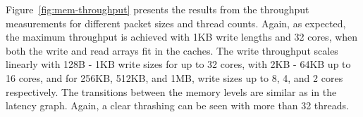 Figure~\ref{fig:mem-throughput} presents the results from the throughput measurements for different packet sizes and thread counts. Again, as expected, the maximum throughput is achieved with 1KB write lengths and 32 cores, when both the write and read arrays fit in the caches. The write throughput scales linearly with 128B - 1KB write sizes for up to 32 cores, with 2KB - 64KB up to 16 cores, and for 256KB, 512KB, and 1MB, write sizes up to 8, 4, and 2 cores respectively. The transitions between the memory levels are similar as in the latency graph. Again, a clear thrashing can be seen with more than 32 threads.



